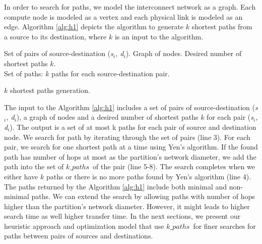 In order to search for paths, we model the interconnect network as a graph. Each compute node is modeled as a vertex and each physical link is modeled as an edge. Algorithm \ref{alg:h1} depicts the algorithm to generate $k$ shortest paths from a source to its destination, where $k$ is an input to the algorithm.
\begin{algorithm}[!htbp]
 Set of pairs of source-destination (\textit{s$_i$, d$_i$}). Graph of nodes. Desired number of shortest paths $k$.\\
 Set of paths: $k$ paths for each source-destination pair.\\
\caption{$k$ shortest paths generation.}
\label{alg:h1}
\end{algorithm}

The input to the Algorithm \ref{alg:h1} includes a set of pairs of source-destination (\textit{s$_i$, d$_i$}), a graph of nodes and a desired number of shortest paths $k$ for each pair (\textit{s$_i$, d$_i$}). The output is a set of at most k paths for each pair of source and destination node. We search for path by iterating through the set of pairs (line 3). For each pair, we search for one shortest path at a time using Yen's algorithm. If the found path has number of hops at most as the partition's network diameter, we add the path into the set of $k\_paths$\ of the pair (line 5-8). The search completes when we either have $k$ paths or there is no more paths found by Yen's algorithm (line 4). The paths returned by the Algorithm \ref{alg:h1} include both minimal and non-minimal paths. We can extend the search by allowing paths with number of hops higher than the partition's network diameter. However, it might leads to higher search time as well higher transfer time. In the next sections, we present our heuristic approach and optimization model that use $k\_paths$\ for finer searches for paths between pairs of sources and destinations.


